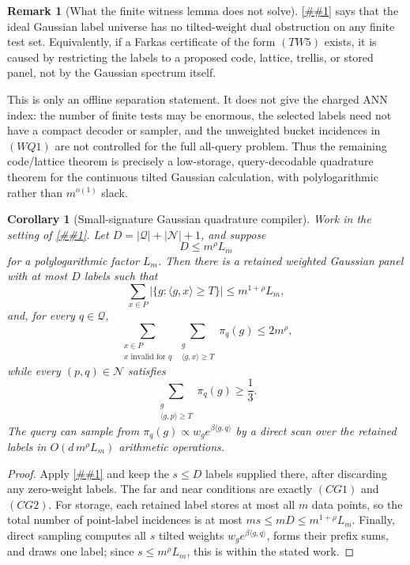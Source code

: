 \documentclass[10pt]{article}
\newcommand{\cref}[1]{\ref{##1}}
\newcommand{\Cref}[1]{\ref{##1}}
\newtheorem{corollary}[theorem]{Corollary}
\theoremstyle{definition}
\newtheorem{remark}[theorem]{Remark}
\newcommand{\ip}[2]{\langle #1,#2\rangle}
\begin{document}
\begin{remark}[What the finite witness lemma does not solve]
   \label{rem:continuous-witness-caveat}
   \Cref{lem:continuous-gaussian-finite-witness} says that the ideal Gaussian
   label universe has no tilted-weight dual obstruction on any finite test
   set.  Equivalently, if a Farkas certificate of the form \((TW5)\) exists,
   it is caused by restricting the labels to a proposed code, lattice, trellis,
   or stored panel, not by the Gaussian spectrum itself.

   This is only an offline separation statement.  It does not give the charged
   ANN index: the number of finite tests may be enormous, the selected labels
   need not have a compact decoder or sampler, and the unweighted bucket
   incidences in \((WQ1)\) are not controlled for the full all-query problem.
   Thus the remaining code/lattice theorem is precisely a low-storage,
   query-decodable quadrature theorem for the continuous tilted Gaussian
   calculation, with polylogarithmic rather than \(m^{o(1)}\) slack.
\end{remark}

\begin{corollary}[Small-signature Gaussian quadrature compiler]
   \label{cor:small-signature-gaussian-quadrature}
   Work in the setting of
   \cref{lem:continuous-gaussian-finite-witness}.  Let
   \(D=|\mathcal Q|+|\mathcal N|+1\), and suppose
   \[
      D\le m^\rho L_m
   \]
   for a polylogarithmic factor \(L_m\).  Then there is a retained weighted
   Gaussian panel with at most \(D\) labels such that
   \[
      \sum_{x\in P}
      |\{g:\ip{g}{x}\ge T\}|
      \le m^{1+\rho}L_m,
      \tag{SQ1}
   \]
   and, for every \(q\in\mathcal Q\),
   \[
      \sum_{\substack{x\in P\\ x\text{ invalid for }q}}
      \sum_{\substack{g\\\ip{g}{x}\ge T}}\pi_q(g)
      \le 2m^\rho,
      \tag{SQ2}
   \]
   while every \((p,q)\in\mathcal N\) satisfies
   \[
      \sum_{\substack{g\\\ip{g}{p}\ge T}}\pi_q(g)
      \ge\frac13 .
      \tag{SQ3}
   \]
   The query can sample from \(\pi_q(g)\propto w_g e^{\beta\ip{g}{q}}\) by a
   direct scan over the retained labels in \(O(d\,m^\rho L_m)\) arithmetic
   operations.
\end{corollary}

\begin{proof}
   Apply \cref{lem:continuous-gaussian-finite-witness} and keep the
   \(s\le D\) labels supplied there, after discarding any zero-weight labels.
   The far and near conditions are exactly \((CG1)\) and \((CG2)\).  For
   storage, each retained label stores at most all \(m\) data points, so the
   total number of point-label incidences is at most
   \(ms\le mD\le m^{1+\rho}L_m\).  Finally, direct sampling computes all \(s\)
   tilted weights \(w_g e^{\beta\ip{g}{q}}\), forms their prefix sums, and
   draws one label; since \(s\le m^\rho L_m\), this is within the stated work.
\end{proof}
\end{document}
